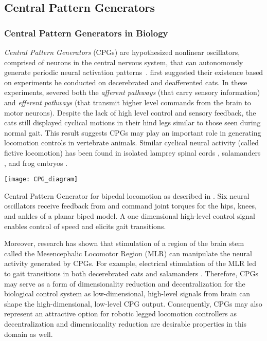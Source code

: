 \subsection{Central Pattern Generators}\label{sec:back_CPG}
\subsubsection{Central Pattern Generators in Biology}
\emph{Central Pattern Generators} (CPGs) are hypothesized nonlinear
oscillators, comprised of neurons in the central nervous system, that can
autonomously generate periodic neural activation
patterns~\citep{ijspeert2008central}.  \citet{brown1911intrinsic} first
suggested their existence based on experiments he conducted on decerebrated and
deafferented cats. In these experiments, \citeauthor{brown1911intrinsic} severed
both the \emph{afferent pathways} (that carry sensory information) and
\emph{efferent pathways} (that transmit higher level commands from the brain to
motor neurons).  Despite the lack of high level control and sensory feedback,
the cats still displayed cyclical motions in their hind legs similar to those
seen during normal gait. This result suggests CPGs may play an important role in
generating locomotion controls in vertebrate animals. Similar cyclical neural
activity (called fictive locomotion) has been found in isolated lamprey spinal
cords \citep{cohen1980neuronal}, salamanders \citep{delvolve1999fictive}, and
frog embryos \citep{soffe1982tonic}. 

\begin{marginfigure}
    \centering
    \texttt{[image: CPG\_diagram]}
    \caption{Central Pattern Generator for bipedal locomotion as described in
    \citet{taga1991self}. Six neural oscillators receive feedback from and
    command joint torques for the hips, knees, and ankles of a planar biped
    model. A one dimensional high-level control signal enables control of speed
    and elicits gait transitions.}
    \label{fig:cpg_diagram}
\end{marginfigure}
Moreover, research has shown that stimulation of a region of the brain stem
called the Mesencephalic Locomotor Region (MLR) can manipulate the neural
activity generated by CPGs. For example, electrical stimulation of the MLR led
to gait transitions in both decerebrated cats \citep{shik1966control} and
salamanders \citep{cabelguen2003bimodal}.  Therefore, CPGs may serve as a form
of dimensionality reduction and decentralization for the biological control
system as low-dimensional, high-level signals from brain can shape the
high-dimensional, low-level CPG output. Consequently, CPGs may also represent
an attractive option for robotic legged locomotion controllers as
decentralization and dimensionality reduction are desirable properties in this
domain as well.

